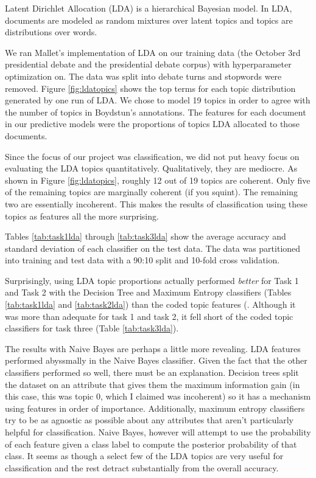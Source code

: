 
Latent Dirichlet Allocation (LDA) is a hierarchical Bayesian model.
In LDA, documents are modeled as random mixtures over latent topics and topics are distributions over words.

We ran Mallet's implementation of LDA on our training data (the October 3rd presidential debate and the presidential debate corpus) with hyperparameter optimization on.
The data was split into debate turns and stopwords were removed.
Figure \ref{fig:ldatopics} shows the top terms for each topic distribution generated by one run of LDA.
We chose to model 19 topics in order to agree with the number of topics in Boydstun's annotations.
The features for each document in our predictive models were the proportions of topics LDA allocated to those documents.

Since the focus of our project was classification, we did not put heavy focus on evaluating the LDA topics quantitatively.
Qualitatively, they are mediocre.
As shown in Figure \ref{fig:ldatopics}, roughly 12 out of 19 topics are coherent.
Only five of the remaining topics are marginally coherent (if you squint).
The remaining two are essentially incoherent.
This makes the results of classification using these topics as features all the more surprising.

Tables \ref{tab:task1lda} through \ref{tab:task3lda} show the average accuracy and standard deviation of each classifier on the test data.
The data was partitioned into training and test data with a 90:10 split and 10-fold cross validation.

Surprisingly, using LDA topic proportions actually performed \textit{better} for Task 1 and Task 2 with the Decision Tree and Maximum Entropy classifiers (Tables \ref{tab:task1lda} and \ref{tab:task2lda}) than the coded topic features (.
Although it was more than adequate for task 1 and task 2, it fell short of the coded topic classifiers for task three (Table \ref{tab:task3lda}).

The results with Naive Bayes are perhaps a little more revealing.
LDA features performed abyssmally in the Naive Bayes classifier.
Given the fact that the other classifiers performed so well, there must be an explanation.
Decision trees split the dataset on an attribute that gives them the maximum information gain (in this case, this was topic 0, which I claimed was incoherent) so it has a mechanism using features in order of importance.
Additionally, maximum entropy classifiers try to be as agnostic as possible about any attributes that aren't particularly helpful for classification.
Naive Bayes, however will attempt to use the probability of each feature given a class label to compute the posterior probability of that class.
It seems as though a select few of the LDA topics are very useful for classification and the rest detract substantially from the overall accuracy.

